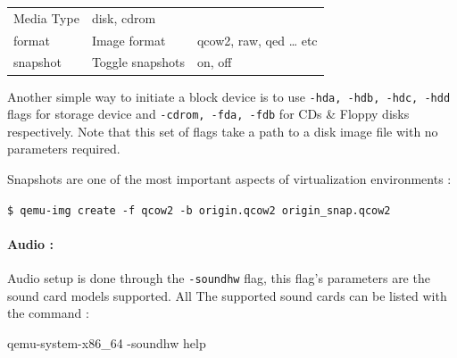 \documentclass[
  14pt,
  english,
  a4paper,
]{scrreprt}
\newenvironment{Shaded}{}{}
\newcommand{\ExtensionTok}[1]{#1}
\newcommand{\NormalTok}[1]{#1}
\begin{document}
\begin{longtable}[]{@{}lll@{}}
\begin{minipage}[t]{0.24\columnwidth}
Media Type\strut
\end{minipage} & \begin{minipage}[t]{0.55\columnwidth}\raggedright
disk, cdrom\strut
\end{minipage}\tabularnewline
\begin{minipage}[t]{0.13\columnwidth}\raggedright
format\strut
\end{minipage} & \begin{minipage}[t]{0.24\columnwidth}\raggedright
Image format\strut
\end{minipage} & \begin{minipage}[t]{0.55\columnwidth}\raggedright
qcow2, raw, qed \ldots{} etc\strut
\end{minipage}\tabularnewline
\begin{minipage}[t]{0.13\columnwidth}\raggedright
snapshot\strut
\end{minipage} & \begin{minipage}[t]{0.24\columnwidth}\raggedright
Toggle snapshots\strut
\end{minipage} & \begin{minipage}[t]{0.55\columnwidth}\raggedright
on, off\strut
\end{minipage}\tabularnewline
\bottomrule
\end{longtable}

Another simple way to initiate a block device is to use
\texttt{-hda,\ -hdb,\ -hdc,\ -hdd} flags for storage device and
\texttt{-cdrom,\ -fda,\ -fdb} for CDs \& Floppy disks respectively. Note
that this set of flags take a path to a disk image file with no
parameters required.

Snapshots are one of the most important aspects of virtualization
environments :

\texttt{\$\ qemu-img\ create\ -f\ qcow2\ -b\ origin.qcow2\ origin\_snap.qcow2}

\hypertarget{audio}{%
\paragraph*{Audio :}\label{audio}}

Audio setup is done through the \texttt{-soundhw} flag, this flag's
parameters are the sound card models supported. All The supported sound
cards can be listed with the command :

\begin{Shaded}
\begin{Highlighting}[]
\ExtensionTok{qemu{-}system{-}x86\_64}\NormalTok{ {-}soundhw help}
\end{Highlighting}
\end{Shaded}
\end{document}
